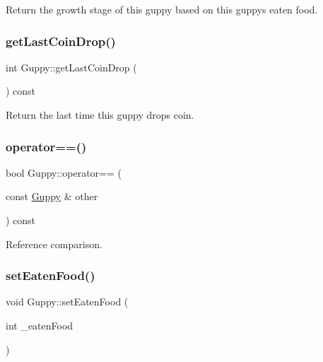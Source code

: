 Return the growth stage of this guppy based on this guppy\textquotesingle{}s eaten food. 

\mbox{\label{class_guppy_aeb89955aa47fafc160580a6d09363826}} 
\subsubsection{\texorpdfstring{get\+Last\+Coin\+Drop()}{getLastCoinDrop()}}
{\footnotesize\ttfamily int Guppy\+::get\+Last\+Coin\+Drop (\begin{DoxyParamCaption}{ }\end{DoxyParamCaption}) const}



Return the last time this guppy drops coin. 

\mbox{\label{class_guppy_a048b328073ca8bec199c50b41cbc4108}} 
\subsubsection{\texorpdfstring{operator==()}{operator==()}}
{\footnotesize\ttfamily bool Guppy\+::operator== (\begin{DoxyParamCaption}\item[{const \mbox{\hyperlink{class_guppy}{Guppy}} \&}]{other }\end{DoxyParamCaption}) const}



Reference comparison. 

\mbox{\label{class_guppy_a718281abaf31796884adfe861ca8b491}} 
\subsubsection{\texorpdfstring{set\+Eaten\+Food()}{setEatenFood()}}
{\footnotesize\ttfamily void Guppy\+::set\+Eaten\+Food (\begin{DoxyParamCaption}\item[{int}]{\+\_\+eaten\+Food }\end{DoxyParamCaption})}



